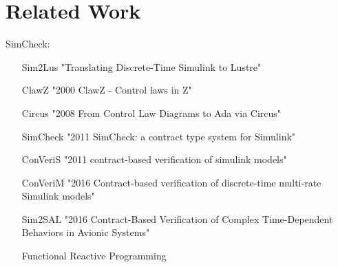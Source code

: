 \section{Related Work}

SimCheck: \cite{Roy2011}
\begin{itemize}
    \item [Sim2Lus]  "Translating Discrete-Time Simulink to Lustre"
    \item [ClawZ] "2000 ClawZ - Control laws in Z"
    \item [Circus] "2008 From Control Law Diagrams to Ada via Circus"
    \item [SimCheck] "2011 SimCheck: a contract type system for Simulink"
    \item [ConVeriS] "2011 contract-based verification of simulink models"
    \item [ConVeriM] "2016 Contract-based verification of discrete-time multi-rate Simulink models"
    \item [Sim2SAL] "2016 Contract-Based Verification of Complex Time-Dependent Behaviors in Avionic Systems"
    \item [Functional Reactive Programming] 
\end{itemize}
